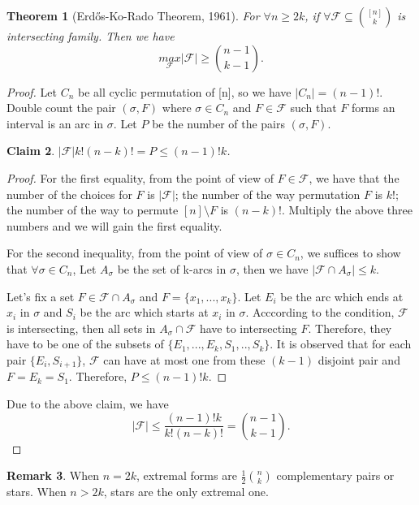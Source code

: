 \documentclass{article}
\newtheorem{theorem}{Theorem}[section]
\newtheorem{claim}[theorem]{Claim}
\theoremstyle{definition}
\newtheorem{remark}[theorem]{Remark}
\def\Erdos{Erd\H{o}s}
\begin{document}
\begin{theorem}[\Erdos{}-Ko-Rado Theorem\cite{erdos1961intersection}, 1961] \label{EKRthm} 
    For $\forall n \ge 2k$, if $\forall \mathcal{F}\subseteq \binom{[n]}{k}$ is intersecting family. Then we have $$\underset{\mathcal{F}}{max}|\mathcal{F}|\ge\binom{n-1}{k-1}.$$
\end{theorem}
\begin{proof}
Let $C_n$ be all cyclic permutation of [n], so we have $|C_n|=(n-1)!$. Double count the pair $(\sigma, F)$ where $\sigma \in C_n$ and $F\in \mathcal{F}$ such that $F$ forms an interval is an arc in $\sigma$. Let $P$ be the number of the pairs $(\sigma, F)$.
\begin{claim}
    $|\mathcal{F}|k!(n-k)!=P\le (n-1)!k$.
\end{claim}
\begin{proof}
    For the first equality, from the point of view of $F\in \mathcal{F}$, we have that the number of the choices for $F$ is $|\mathcal{F}|$; the number of the way permutation $F$ is $k!$; the number of the way to permute $[n]\setminus F$ is $(n-k)!$. Multiply the above three numbers and we will gain the first equality.

    For the second inequality, from the point of view of $\sigma\in C_n$, we suffices to show that $\forall \sigma \in C_n$, Let $A_{\sigma}$ be the set of k-arcs in $\sigma$, then we have $|\mathcal{F}\cap A_{\sigma}|\le k$.
    
    Let's fix a set $F\in \mathcal{F}\cap A_{\sigma}$ and $F=\{x_1,...,x_k\}$. Let $E_i$ be the arc which ends at $x_i$ in $\sigma$ and $S_i$ be the arc which starts at $x_i$ in $\sigma$. Acccording to the condition, $\mathcal{F}$ is intersecting, then all sets in $A_{\sigma}\cap\mathcal{F}$ have to intersecting $F$. Therefore, they have to be one of the subsets of $\{E_1,...,E_k,S_1,..,S_k\}$. It is observed that for each pair  $\{E_i, S_{i+1}\}$, $\mathcal{F}$ can have at most one from these $(k-1)$ disjoint pair and $F=E_k=S_1$. Therefore, $P\le (n-1)!k$.
\end{proof}

Due to the above claim, we have
$$|\mathcal{F}|\le \frac{(n-1)!k}{k!(n-k)!}=\binom{n-1}{k-1}.$$
\end{proof}

\begin{remark}
When $n=2k$, extremal forms are $\frac{1}{2}\binom{n}{k}$ complementary pairs or stars. When $n>2k$, stars are the only extremal one.
\end{remark}
\end{document}
